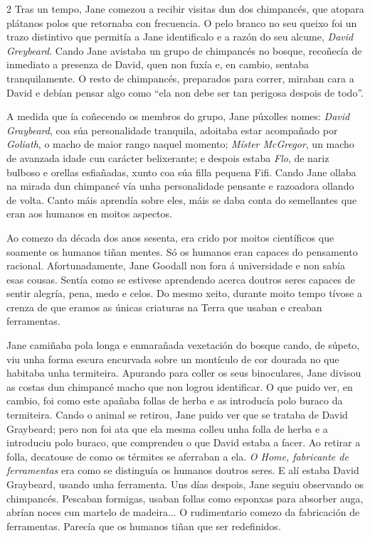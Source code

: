 \begin{multicols}{2}
Tras un tempo, Jane comezou a recibir visitas dun dos chimpancés, que atopara
plátanos polos que retornaba con frecuencia. O pelo branco no seu queixo foi un
trazo distintivo que permitía a Jane identificalo e a razón do seu alcume,
\textit{David Greybeard}. Cando Jane avistaba un grupo de chimpancés no bosque,
recoñecía de inmediato a presenza de David, quen non fuxía e, en cambio,
sentaba tranquilamente. O resto de chimpancés, preparados para correr, miraban
cara a David e debían pensar algo como ``ela non debe ser tan perigosa despois
de todo''.

A medida que ía coñecendo os membros do grupo, Jane púxolles nomes:
\textit{David Graybeard}, coa súa personalidade tranquila, adoitaba estar
acompañado por \textit{Goliath}, o macho de maior rango naquel momento;
\textit{Míster McGregor}, un macho de avanzada idade cun carácter belixerante;
e despois estaba \textit{Flo}, de nariz bulboso e orellas esfiañadas, xunto coa
súa filla pequena Fifi. Cando Jane ollaba na mirada dun chimpancé vía unha
personalidade pensante e razoadora ollando de volta. Canto máis aprendía sobre
eles, máis se daba conta do semellantes que eran aos humanos en moitos
aspectos.

Ao comezo da década dos anos sesenta, era crido por moitos científicos que
soamente os humanos tiñan mentes. Só os humanos eran capaces do pensamento
racional. Afortunadamente, Jane Goodall non fora á universidade e non sabía
esas cousas. Sentía como se estivese aprendendo acerca doutros seres capaces de
sentir alegría, pena, medo e celos. Do mesmo xeito, durante moito tempo tívose
a crenza de que eramos as únicas criaturas na Terra que usaban e creaban
ferramentas.

Jane camiñaba pola longa e enmarañada vexetación do bosque cando, de súpeto,
viu unha forma escura encurvada sobre un montículo de cor dourada no que
habitaba unha termiteira. Apurando para coller os seus binoculares, Jane
divisou as costas dun chimpancé macho que non logrou identificar. O que puido
ver, en cambio, foi como este apañaba follas de herba e as introducía polo
buraco da termiteira. Cando o animal se retirou, Jane puido ver que se trataba
de David Graybeard; pero non foi ata que ela mesma colleu unha folla de herba e
a introduciu polo buraco, que comprendeu o que David estaba a facer. Ao retirar
a folla, decatouse de como os térmites se aferraban a ela. \textit{O Home,
fabricante de ferramentas} era como se distinguía os humanos doutros seres. E
alí estaba David Graybeard, usando unha ferramenta. Uns días despois, Jane
seguiu observando os chimpancés. Pescaban formigas, usaban follas como esponxas
para absorber auga, abrían noces cun martelo de madeira... O rudimentario
comezo da fabricación de ferramentas. Parecía que os humanos tiñan que ser
redefinidos.


\end{multicols}
